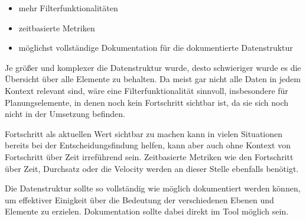 \begin{itemize}
    \item mehr Filterfunktionalitäten
    \item zeitbasierte Metriken
    \item möglichst vollständige Dokumentation für die dokumentierte Datenstruktur
\end{itemize}

Je größer und komplexer die Datenstruktur wurde, desto schwieriger wurde es die Übersicht über alle Elemente zu behalten. Da meist gar nicht alle Daten in jedem Kontext relevant sind, wäre eine Filterfunktionalität sinnvoll, insbesondere für Planungselemente, in denen noch kein Fortschritt sichtbar ist, da sie sich noch nicht in der Umsetzung befinden.

Fortschritt als aktuellen Wert sichtbar zu machen kann in vielen Situationen bereits bei der Entscheidungsfindung helfen, kann aber auch ohne Kontext von Fortschritt über Zeit irreführend sein. Zeitbasierte Metriken wie den Fortschritt über Zeit, Durchsatz oder die Velocity werden an dieser Stelle ebenfalls benötigt.

Die Datenstruktur sollte so vollständig wie möglich dokumentiert werden können, um effektiver Einigkeit über die Bedeutung der verschiedenen Ebenen und Elemente zu erzielen. Dokumentation sollte dabei direkt im Tool möglich sein.